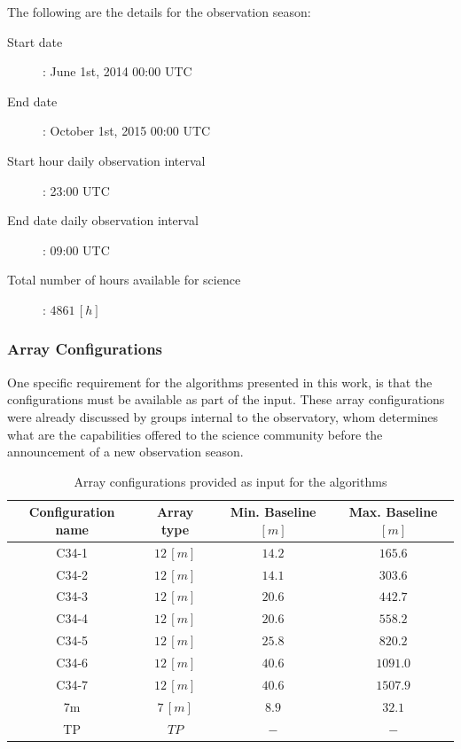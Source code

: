 The following are the details for the observation season:

\begin{description}
\item[Start date]: June 1st, 2014 00:00 UTC 
\item[End date]: October 1st, 2015 00:00 UTC
\item[Start hour daily observation interval]: 23:00 UTC
\item[End date daily observation interval]: 09:00 UTC
\item[Total number of hours available for science]: $4861\,[h]$
\end{description}

\subsubsection{Array Configurations}

One specific requirement for the algorithms presented in this work, is that the configurations must be available as part of the input. These array configurations were already discussed by groups internal to the observatory, whom determines what are the capabilities offered to the science community before the announcement of a new observation season.

\begin{table}[h!]
\begin{center}
\begin{tabular}{|c|c|c|c|}
\hline
Configuration name & Array type & Min. Baseline $[m]$ & Max. Baseline $[m]$\\
\hline
C34-1 & $12\,[m]$ & $14.2$ & $165.6$ \\
\hline
C34-2 & $12\,[m]$ & $14.1$ & $303.6$ \\
\hline
C34-3 & $12\,[m]$ & $20.6$ & $442.7$ \\
\hline
C34-4 & $12\,[m]$ & $20.6$ & $558.2$ \\
\hline
C34-5 & $12\,[m]$ & $25.8$ & $820.2$ \\
\hline
C34-6 & $12\,[m]$ & $40.6$ & $1091.0$ \\
\hline
C34-7 & $12\,[m]$ & $40.6$ & $1507.9$ \\
\hline
7m    & $7\,[m]$  & $8.9$  & $32.1$ \\
\hline
TP    & $TP$      & $-$    & $-$ \\
\hline
\end{tabular}
\end{center}
\caption{Array configurations provided as input for the algorithms}
\label{table:input-array-configs}
\end{table}

